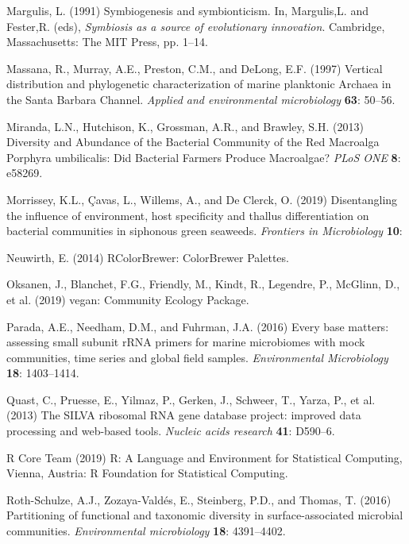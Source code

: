 \documentclass[12pt,]{article}
\begin{document}
\leavevmode\hypertarget{ref-Margulis1991}{}%
Margulis, L. (1991) Symbiogenesis and symbionticism. In, Margulis,L. and
Fester,R. (eds), \emph{Symbiosis as a source of evolutionary
innovation}. Cambridge, Massachusetts: The MIT Press, pp. 1--14.

\leavevmode\hypertarget{ref-Massana1997}{}%
Massana, R., Murray, A.E., Preston, C.M., and DeLong, E.F. (1997)
Vertical distribution and phylogenetic characterization of marine
planktonic Archaea in the Santa Barbara Channel. \emph{Applied and
environmental microbiology} \textbf{63}: 50--56.

\leavevmode\hypertarget{ref-Miranda2013}{}%
Miranda, L.N., Hutchison, K., Grossman, A.R., and Brawley, S.H. (2013)
Diversity and Abundance of the Bacterial Community of the Red Macroalga
Porphyra umbilicalis: Did Bacterial Farmers Produce Macroalgae?
\emph{PLoS ONE} \textbf{8}: e58269.

\leavevmode\hypertarget{ref-Morrissey2019}{}%
Morrissey, K.L., Çavas, L., Willems, A., and De Clerck, O. (2019)
Disentangling the influence of environment, host specificity and thallus
differentiation on bacterial communities in siphonous green seaweeds.
\emph{Frontiers in Microbiology} \textbf{10}:

\leavevmode\hypertarget{ref-Neuwirth2014}{}%
Neuwirth, E. (2014) RColorBrewer: ColorBrewer Palettes.

\leavevmode\hypertarget{ref-Oksanen2019}{}%
Oksanen, J., Blanchet, F.G., Friendly, M., Kindt, R., Legendre, P.,
McGlinn, D., et al. (2019) vegan: Community Ecology Package.

\leavevmode\hypertarget{ref-Parada2016}{}%
Parada, A.E., Needham, D.M., and Fuhrman, J.A. (2016) Every base
matters: assessing small subunit rRNA primers for marine microbiomes
with mock communities, time series and global field samples.
\emph{Environmental Microbiology} \textbf{18}: 1403--1414.

\leavevmode\hypertarget{ref-Quast2013}{}%
Quast, C., Pruesse, E., Yilmaz, P., Gerken, J., Schweer, T., Yarza, P.,
et al. (2013) The SILVA ribosomal RNA gene database project: improved
data processing and web-based tools. \emph{Nucleic acids research}
\textbf{41}: D590--6.

\leavevmode\hypertarget{ref-RCoreTeam2019}{}%
R Core Team (2019) R: A Language and Environment for Statistical
Computing, Vienna, Austria: R Foundation for Statistical Computing.

\leavevmode\hypertarget{ref-Roth-Schulze2016}{}%
Roth-Schulze, A.J., Zozaya-Valdés, E., Steinberg, P.D., and Thomas, T.
(2016) Partitioning of functional and taxonomic diversity in
surface-associated microbial communities. \emph{Environmental
microbiology} \textbf{18}: 4391--4402.
\end{document}
